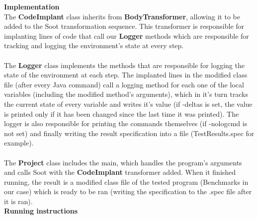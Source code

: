 \documentclass[10pt]{article}
\begin{document}
\textbf{Implementation} \\
 The \textbf{CodeImplant} class inherits from \textbf{BodyTransformer}, allowing it to be added to the Soot transformation sequence. This transformer is responsible for implanting lines of code that call our \textbf{Logger} methods which are responsible for tracking and logging the environment's state at every step. \\
 \\The \textbf{Logger} class implements the methods that are responsible for logging the state of the environment at each step. The implanted lines in the modified class file (after every Java command) call a logging method for each one of the local variables (including the modified method's arguments), which in it's turn tracks the current state of every variable and writes it's value (if -deltas is set, the value is printed only if it has been changed since the last time it was printed). The logger is also responsible for printing the commands themselves (if -nologcmd is not set) and finally writing the result specification into a file (Test\textunderscore Results.spec for example).\\ 
 \\The \textbf{Project} class includes the main, which handles the program's arguments and calls Soot with the \textbf{CodeImplant} transformer added. When it finished running, the result is a modified class file of the tested program (Benchmarks in our case) which is ready to be ran (writing the specification to the .spec file after it is ran).\\
 \newpage
\textbf{Running instructions} \\
\end{document}
